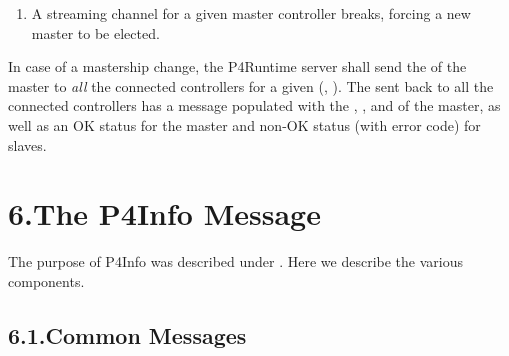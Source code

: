\documentclass[11pt]{article}
\begin{document}
{\begin{enumerate}
\item{}
A streaming channel for a given master controller breaks, forcing a new
master to be elected.%
\end{enumerate}%

\noindent{}In case of a mastership change, the P4Runtime server shall send the
 of the master to \emph{all} the connected controllers for a given
(, ).  The  sent back to all the
connected controllers has a  message populated with the
, , and  of the master, as well as an OK status
for the master and non-OK status (with  error code) for slaves.%

\section{6.\hspace*{0.5em}The P4Info Message}\label{sec-the-p4info-message}%

\noindent{}The purpose of P4Info was described under
.
Here we describe the various
components.%

\subsection{6.1.\hspace*{0.5em}Common Messages}\label{sec-common-messages}%

}
\end{document}
